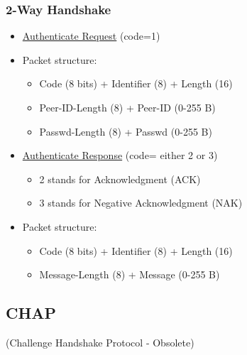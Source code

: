 \subsubsection{2-Way Handshake}

\begin{tcolorbox}[colback=yellow!10!white, colframe=yellow!70!black, title=Peer \textrightarrow Authenticator] 
    
    \begin{itemize}
        \item \underline{Authenticate Request} (code=1)
        \item Packet structure:
        \begin{itemize}
            \item Code (8 bits) + Identifier (8) + Length (16)
            \item Peer-ID-Length (8) + Peer-ID (0-255 B)
            \item Passwd-Length (8) + Passwd (0-255 B)
        \end{itemize}
    \end{itemize}
\end{tcolorbox}

\begin{tcolorbox}[colback=yellow!10!white, colframe=yellow!70!black, title=Authenticator \textrightarrow Peer] 
    
    \begin{itemize}
        \item \underline{Authenticate Response} (code= either 2 or 3)
        \begin{itemize}
            \item 2 stands for Acknowledgment (ACK)
            \item 3 stands for Negative Acknowledgment (NAK)
        \end{itemize}
        \item Packet structure:
        \begin{itemize}
            \item Code (8 bits) + Identifier (8) + Length (16)
            \item Message-Length (8) + Message (0-255 B)
        \end{itemize}
    \end{itemize}
\end{tcolorbox}


\subsection{CHAP}
\begin{center}
    (Challenge Handshake Protocol - Obsolete)
\end{center}


